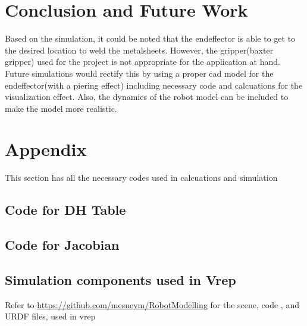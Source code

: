\documentclass[12pt]{article}
\begin{document}
\section{Conclusion and Future Work}
Based on the simulation, it could be noted that the endeffector is able to get to the desired location to weld the metalsheets.
However, the gripper(baxter gripper) used for the project is not appropriate for the application at hand. Future simulations would
rectify this by using a proper cad model for the endeffector(with a piering effect)  including necessary code and calcuations for
the visualization effect. Also, the dynamics of the robot model can be included to make the model more realistic.

\newpage
\section{Appendix}
This section has all the necessary codes used in calcuations and simulation
\subsection{Code for DH Table}


\subsection{Code for Jacobian}


\subsection{Simulation components used in Vrep}
Refer to \url{https://github.com/mesneym/RobotModelling} for the scene, code , and URDF files, used in vrep
\end{document}
